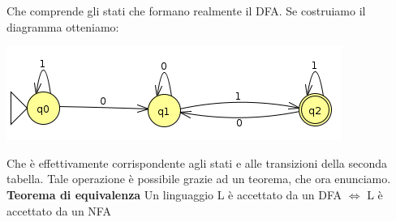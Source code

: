 \documentclass[]{article}
\begin{document}
				Che comprende gli stati che formano realmente il DFA. Se costruiamo il diagramma otteniamo:
				\begin{center}
					\includegraphics{NFADFA2.png}
				\end{center}
				Che è effettivamente corrispondente agli stati e alle transizioni della seconda tabella.\newline
				Tale operazione è possibile grazie ad un teorema, che ora enunciamo.
				\newline \newline
				\textbf{Teorema di equivalenza}\newline
				Un linguaggio L è accettato da un DFA $\Leftrightarrow$ L è accettato da un NFA
\end{document}

